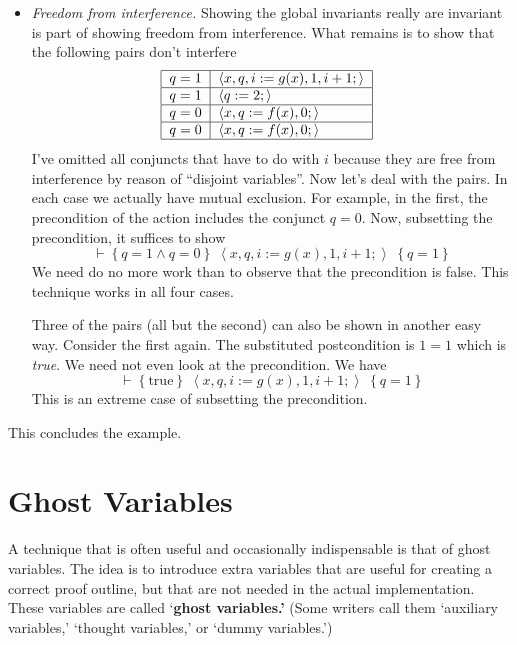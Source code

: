 \documentclass[11pt]{article}%
\begin{document}
\begin{itemize}
\item \emph{Freedom from interference.} Showing the global invariants really
are invariant is part of showing freedom from interference. What remains is to
show that the following pairs don't interfere%
\[%
\begin{tabular}
[c]{|l|l|}\hline
$q=1$ & $\left\langle x,q,i:=g(x),1,i+1;\right\rangle $\\\hline
$q=1$ & $\left\langle q:=2;\right\rangle $\\\hline
$q=0$ & $\left\langle x,q:=f(x),0;\right\rangle $\\\hline
$q=0$ & $\left\langle x,q:=f(x),0;\right\rangle $\\\hline
\end{tabular}
\ \
\]
I've omitted all conjuncts that have to do with $i$ because they are free from
interference by reason of \textquotedblleft disjoint
variables\textquotedblright. Now let's deal with the pairs. In each case we
actually have mutual exclusion. For example, in the first, the precondition of
the action includes the conjunct $q=0$. Now, subsetting the precondition, it
suffices to show%
\[
\vdash\left\{  q=1\wedge q=0\right\}  \;\left\langle
x,q,i:=g(x),1,i+1;\right\rangle \;\left\{  q=1\right\}
\]
We need do no more work than to observe that the precondition is false. This
technique works in all four cases.

Three of the pairs (all but the second) can also be shown in another easy way.
Consider the first again. The substituted postcondition is $1=1$ which is
\textit{true}. We need not even look at the precondition. We have%
\[
\vdash\left\{  \mathrm{true}\right\}  \;\left\langle
x,q,i:=g(x),1,i+1;\right\rangle \;\left\{  q=1\right\}
\]
This is an extreme case of subsetting the precondition.
\end{itemize}

This concludes the example.

\section{Ghost Variables\label{ghost}}

A technique that is often useful and occasionally indispensable is that of
ghost variables. The idea is to introduce extra variables that are useful for
creating a correct proof outline, but that are not needed in the actual
implementation. These variables are called `\textbf{ghost variables.'} (Some
writers call them `auxiliary variables,' `thought variables,' or `dummy variables.')
\end{document}

